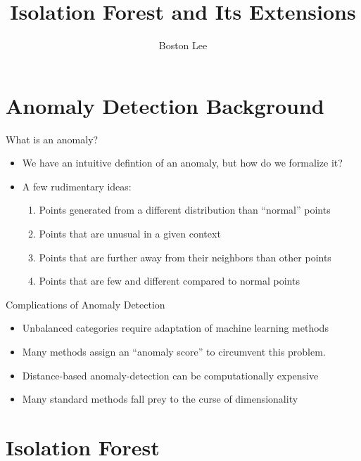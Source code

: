 \documentclass{beamer}
\title{Isolation Forest and Its Extensions}
\author{Boston Lee}
\institute{Colorado State University}
\date{}
\begin{document}
\begin{frame}
  \titlepage
\end{frame}

\section{Anomaly Detection Background}

\begin{frame}{What is an anomaly?}
    \begin{itemize}
        \item We have an intuitive defintion of an anomaly, but how do we
            formalize it?
        \item A few rudimentary ideas:
            \begin{enumerate}
                \item Points generated from a different distribution than
                    ``normal'' points
                \item Points that are unusual in a given context
                \item Points that are further away from their neighbors than
                    other points
                \item Points that are few and different compared to normal points
            \end{enumerate}
    \end{itemize}
\end{frame}

\begin{frame}{Complications of Anomaly Detection}
    \begin{itemize}
        \item Unbalanced categories require adaptation of machine learning
            methods
        \item Many methods assign an ``anomaly score'' to circumvent this
            problem.
        \item Distance-based anomaly-detection can be computationally expensive
        \item Many standard methods fall prey to the curse of dimensionality
    \end{itemize}
\end{frame}

\section{Isolation Forest}
\end{document}
